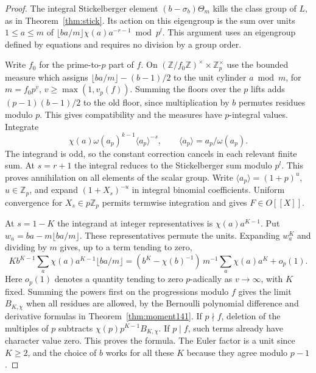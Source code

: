 \documentclass[a4paper,11pt]{article}
\theoremstyle{definition}
\theoremstyle{remark}
\newcommand{\ZZ}{\mathbb Z}\newcommand{\ord}{\operatorname{ord}}
\numberwithin{equation}{section}
\begin{document}
\begin{proof}
The integral Stickelberger element \((b-\sigma_b)\Theta_m\) kills
the class group of \(L\), as in Theorem~\ref{thm:stick}.
Its action on this eigengroup is the sum over units \(1\le a\le m\)
of \(\lfloor ba/m\rfloor\chi(a)a^{-r-1}\bmod p^l\). This argument
uses an eigengroup defined by equations and requires no division
by a group order.

Write \(f_0\) for the prime-to-\(p\) part of \(f\). On
\((\ZZ/f_0\ZZ)^\times\times\ZZ_p^\times\) use the bounded measure
which assigns \(\lfloor ba/m\rfloor-(b-1)/2\) to the unit cylinder
\(a\bmod m\), for \(m=f_0p^v\), \(v\ge\max(1,v_p(f))\).
Summing the floors over the \(p\) lifts adds
\((p-1)(b-1)/2\) to the old floor, since multiplication by \(b\)
permutes residues modulo \(p\). This gives compatibility and
the measures have \(p\)-integral values. Integrate
\[
 \chi(a)\omega(a_p)^{k-1}\langle a_p\rangle^{-s},
 \qquad \langle a_p\rangle=a_p/\omega(a_p).
\]
The integrand is odd, so the constant correction cancels in
each relevant finite sum. At \(s=r+1\) the integral reduces to
the Stickelberger sum modulo \(p^l\). This proves annihilation
on all elements of the scalar group. Write
\(\langle a_p\rangle=(1+p)^u\), \(u\in\ZZ_p\), and expand
\((1+X_s)^{-u}\) in integral binomial coefficients. Uniform
convergence for \(X_s\in p\ZZ_p\) permits termwise integration
and gives \(F\in O[[X]]\).

At \(s=1-K\) the integrand at integer representatives is
\(\chi(a)a^{K-1}\). Put \(w_a=ba-m\lfloor ba/m\rfloor\).
These representatives permute the units. Expanding \(w_a^K\)
and dividing by \(m\) gives, up to a term tending to zero,
\[
 Kb^{K-1}\sum_a\chi(a)a^{K-1}\lfloor ba/m\rfloor
 = (b^K-\chi(b)^{-1})\,m^{-1}\sum_a\chi(a)a^K+o_p(1).
\]
Here \(o_p(1)\) denotes a quantity tending to zero \(p\)-adically
as \(v\to\infty\), with \(K\) fixed. Summing the powers first on
the progressions modulo \(f\) gives the limit \(B_{K,\chi}\)
when all residues are allowed, by the Bernoulli polynomial
difference and derivative formulas in Theorem~\ref{thm:moment141}.
If \(p\nmid f\), deletion of the multiples of \(p\) subtracts
\(\chi(p)p^{K-1}B_{K,\chi}\). If \(p\mid f\), such terms already
have character value zero. This proves the formula. The Euler
factor is a unit since \(K\ge2\), and the choice of \(b\) works
for all these \(K\) because they agree modulo \(p-1\).
\end{proof}
\end{document}
